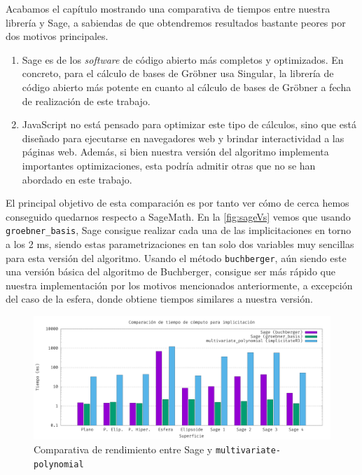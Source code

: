 Acabamos el capítulo mostrando una comparativa de tiempos entre nuestra librería y Sage, a sabiendas de que obtendremos resultados bastante peores por dos motivos principales.
\begin{enumerate}
    \item Sage es de los \textit{software} de código abierto más completos y optimizados. En concreto, para el cálculo de bases de Gröbner usa Singular, la librería de código abierto más potente en cuanto al cálculo de bases de Gröbner a fecha de realización de este trabajo.
    \item JavaScript no está pensado para optimizar este tipo de cálculos, sino que está diseñado para ejecutarse en navegadores web y brindar interactividad a las páginas web. Además, si bien nuestra versión del algoritmo implementa importantes optimizaciones, esta podría admitir otras que no se han abordado en este trabajo.
\end{enumerate}
El principal objetivo de esta comparación es por tanto ver cómo de cerca hemos conseguido quedarnos respecto a SageMath. En la \autoref{fig:sageVs} vemos que usando \texttt{groebner\_basis}, Sage consigue realizar cada una de las implicitaciones en torno a los 2 ms, siendo estas parametrizaciones en tan solo dos variables muy sencillas para esta versión del algoritmo. Usando  el método \texttt{buchberger}, aún siendo este una versión básica del algoritmo de Buchberger, consigue ser más rápido que nuestra implementación por los motivos mencionados anteriormente, a excepción del caso de la esfera, donde obtiene tiempos similares a nuestra versión.
\begin{figure}[!ht]
    \centering
    \includegraphics[width=\textwidth]{Plantilla-TFG-master/img/graficas/TiemposImp.png}
    \caption{Comparativa de rendimiento entre Sage y \texttt{multivariate-polynomial}}
    \label{fig:sageVs}
\end{figure}
